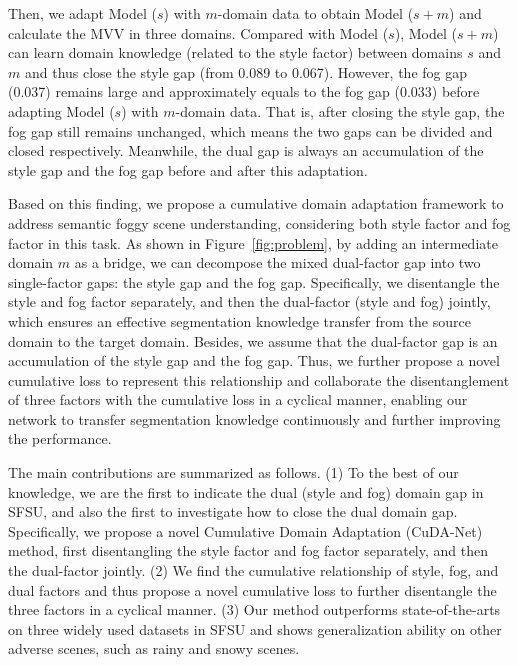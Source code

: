 \documentclass[10pt,twocolumn,letterpaper]{article}
\def\imd{m}
\begin{document}
Then, we adapt Model ($s$) with $m$-domain data to obtain Model ($s+m$) and calculate the MVV in three domains. Compared with Model ($s$), Model ($s+m$) can learn domain knowledge (related to the style factor) between domains $s$ and $m$ and thus close the style gap (from 0.089 to 0.067). However, the fog gap (0.037) remains large and approximately equals to the fog gap (0.033) before adapting Model ($s$) with $m$-domain data. That is, after closing the style gap, the fog gap still remains unchanged, which means the two gaps can be divided and closed respectively. Meanwhile, the dual gap is always an accumulation of the style gap and the fog gap before and after this adaptation.







Based on this finding, we propose a cumulative domain adaptation framework to address semantic foggy scene understanding, considering both style factor and fog factor in this task. As shown in Figure~\ref{fig:problem}, by adding an intermediate domain $\imd$ as a bridge, we can decompose the mixed dual-factor gap into two single-factor gaps: the style gap and the fog gap. Specifically, we disentangle the style and fog factor separately, and then the dual-factor (style and fog) jointly, which ensures an effective segmentation knowledge transfer from the source domain to the target domain.
Besides, we assume that the dual-factor gap is an accumulation of the style gap and the fog gap. Thus, we further propose a novel cumulative loss to represent this relationship and collaborate the disentanglement of three factors with the cumulative loss in a cyclical manner, enabling our network to transfer segmentation knowledge continuously and further improving the performance.








The main contributions are summarized as follows.
(1) To the best of our knowledge, we are the first to indicate the dual (style and fog) domain gap in SFSU, and also the first to investigate how to close the dual domain gap. Specifically, we propose a novel Cumulative Domain Adaptation (CuDA-Net) method, first disentangling the style factor and fog factor separately, and then the dual-factor jointly. 
(2) We find the cumulative relationship of style, fog, and dual factors and thus propose a novel cumulative loss to further disentangle the three factors in a cyclical manner.
(3) Our method outperforms state-of-the-arts on three widely used datasets in SFSU and shows generalization ability on other adverse scenes, such as rainy and snowy scenes.
\end{document}
